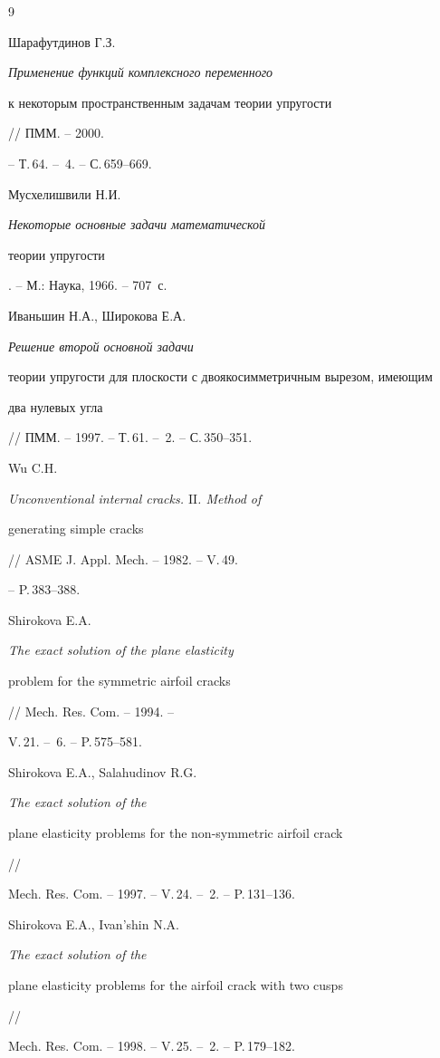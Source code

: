 \begin{thebibliography}{9}







Шарафутдинов Г.З. {\em Применение функций комплексного переменного


к некоторым пространственным задачам теории упругости} // ПММ. -- 2000.


-- Т.\,64. -- \No\,4. -- С.\,659--669.




Мусхелишвили Н.И. {\em Некоторые основные задачи математической


теории упругости}. -- М.: Наука, 1966. -- 707~с. 




Иваньшин Н.А., Широкова Е.А. {\em Решение второй основной задачи


теории упругости для плоскости с двоякосимметричным вырезом, имеющим


два нулевых угла} // ПММ. -- 1997. -- Т.\,61. -- \No\,2. -- С.\,350--351.




Wu C.H. {\em Unconventional internal cracks. $\mathrm{II}$. Method of


generating simple cracks} // ASME J. Appl. Mech. -- 1982. -- V.\,49.


-- P.\,383--388.




Shirokova E.A. {\em The exact solution of the plane elasticity


problem for the symmetric airfoil cracks} // Mech. Res. Com. -- 1994. --


V.\,21. -- \No\,6. -- P.\,575--581.




Shirokova E.A., Salahudinov R.G. {\em The exact solution of the


plane elasticity problems for the non-symmetric airfoil crack} //


Mech. Res. Com. -- 1997. -- V.\,24. -- \No\,2. -- P.\,131--136.




Shirokova E.A., Ivan'shin N.A. {\em The exact solution of the


plane elasticity problems for the airfoil crack with two cusps} //


Mech. Res. Com. -- 1998. -- V.\,25. -- \No\,2. -- P.\,179--182.



\end{thebibliography}
